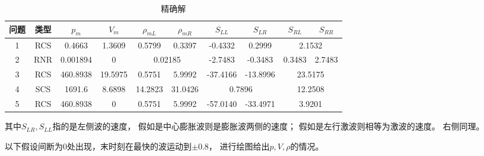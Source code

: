 \documentclass[UTF8,zihao=5]{ctexart} %
\begin{document}
\begin{table}[H]
    \small
    \begin{center}
        \caption{精确解}
        \begin{tabular}{|c|c|c|c|c|c|c|c|c|c|}
            \hline
            问题 & 类型 & $p_m$    & $V_m$   & $\rho_{mL}$                   & ${\rho_{mR}}$ & $S_{LL}$                     & $S_{LR}$                      & $S_{RL}$                      & $S_{RR}$ \\
            \hline
            1    & RCS  & 0.4663   & 1.3609  & 0.5799                        & 0.3397        & -0.4332                      & 0.2999                        & \multicolumn{2}{|c|}{2.1532}             \\
            \hline
            2    & RNR  & 0.001894 & 0       & \multicolumn{2}{|c|}{0.02185} & -2.7483       & -0.3483                      & 0.3483                        & 2.7483                                   \\
            \hline
            3    & RCS  & 460.8938 & 19.5975 & 0.5751                        & 5.9992        & -37.4166                     & -13.8996                      & \multicolumn{2}{|c|}{23.5175}            \\
            \hline
            4    & SCS  & 1691.6   & 8.6898  & 14.2823                       & 31.0426       & \multicolumn{2}{|c|}{0.7896} & \multicolumn{2}{|c|}{12.2508}                                            \\
            \hline
            5    & RCS  & 460.8938 & 0       & 0.5751                        & 5.9992        & -57.0140                     & -33.4971                      & \multicolumn{2}{|c|}{3.9201}             \\
            \hline
        \end{tabular}
    \end{center}
\end{table}

其中$S_{LR},S_{LL}$指的是左侧波的速度，
假如是中心膨胀波则是膨胀波两侧的速度；
假如是左行激波则相等为激波的速度。
右侧同理。

以下假设间断为0处出现，末时刻在最快的波运动到$\pm0.8$，
进行绘图给出$p,V,\rho$的情况。
\end{document}
